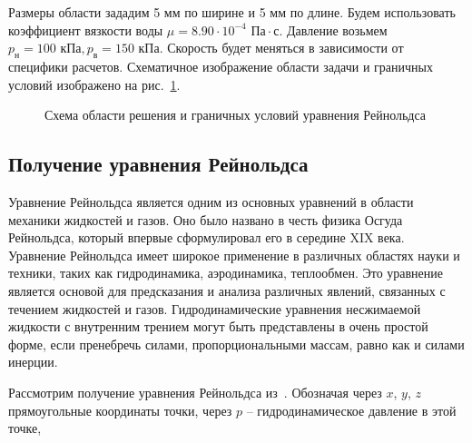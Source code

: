\documentclass[a4paper,14pt]{extarticle}
\begin{document}
Размеры области зададим 5 мм по ширине и 5 мм по длине. Будем использовать коэффициент вязкости воды $\mu = 8.90 \cdot 10^{-4} \text{ Па} \cdot \text{с}$.
\newline Давление возьмем $p_{\text{н}} = 100 \text{ кПа}, p_{\text{в}} = 150 \text{ кПа}$. Скорость будет меняться в зависимости от специфики расчетов. Схематичное изображение области задачи и граничных условий изображено на рис.~\ref{obl_resh}.

\begin{figure}[!htbp]
	\caption{Схема области решения и граничных условий уравнения Рейнольдса}
	\label{obl_resh}
\end{figure}

\subsection{Получение уравнения Рейнольдса}

Уравнение Рейнольдса является одним из основных уравнений в области механики жидкостей и газов. Оно было названо в честь физика Осгуда Рейнольдса, который впервые сформулировал его в середине XIX века.
Уравнение Рейнольдса имеет широкое применение в различных областях науки и техники, таких как гидродинамика, аэродинамика, теплообмен. Это уравнение является основой для предсказания и анализа различных явлений, связанных с течением жидкостей и газов.
Гидродинамические уравнения несжимаемой жидкости с
внутренним трением могут быть представлены в очень простой
форме, если пренебречь силами, пропорциональными массам,
равно как и силами инерции.

Рассмотрим получение уравнения Рейнольдса из~\cite{petrov_smazka}. Обозначая через $x$, $y$, $z$ прямоугольные координаты точки, через $p$ -- гидродинамическое давление в этой точке,
\end{document}
